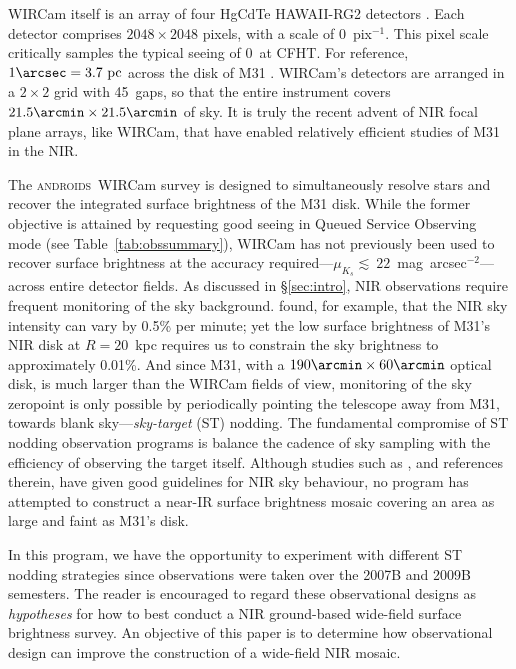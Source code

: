 \documentclass[iop]{emulateapj}
\newcommand{\androids}{\textsc{androids}}
\newcommand{\Tab}[1]{Table~\ref{tab:#1}}  %
\newcommand{\Sec}[1]{\S\ref{sec:#1}}  %
\begin{document}
WIRCam itself is an array of four HgCdTe HAWAII-RG2 detectors \citep{Puget:2004}.
Each detector comprises $2048\times 2048$ pixels, with a scale of 0~pix$^{-1}$.
This pixel scale critically samples the typical seeing of 0~at CFHT\@.
For reference, $1\arcsec = 3.7~\mathrm{pc}$ across the disk of M31 \citep[we adopt $D_\mathrm{M31} = 785$~kpc,][]{McConnachie:2005}.
WIRCam's detectors are arranged in a $2\times 2$ grid with 45\arcsec~gaps, so that the entire instrument covers $21.5\arcmin \times 21.5\arcmin$ of sky.
It is truly the recent advent of NIR focal plane arrays, like WIRCam, that have enabled relatively efficient studies of M31 in the NIR.

The \androids\ WIRCam survey is designed to simultaneously resolve stars and recover the integrated surface brightness of the M31 disk.
While the former objective is attained by requesting good seeing in Queued Service Observing mode (see \Tab{obssummary}), WIRCam has not previously been used to recover surface brightness at the accuracy required---$\mu_{K_s}\lesssim~22$~mag~arcsec$^{-2}$---across entire detector fields.
As discussed in \Sec{intro}, NIR observations require frequent monitoring of the sky background.
\cite{Vaduvescu:2004} found, for example, that the NIR sky intensity can vary by 0.5\% per minute; yet the low surface brightness of M31's NIR disk at $R=20$~kpc requires us to constrain the sky brightness to approximately 0.01\%.
And since M31, with a $190\arcmin \times 60\arcmin$ optical disk, is much larger than the WIRCam fields of view, monitoring of the sky zeropoint is only possible by periodically pointing the telescope away from M31, towards blank sky---\emph{sky-target} (ST) nodding. 
The fundamental compromise of ST nodding observation programs is balance the cadence of sky sampling with the efficiency of observing the target itself.
Although studies such as \cite{Vaduvescu:2004}, and references therein, have given good guidelines for NIR sky behaviour, no program has attempted to construct a near-IR surface brightness mosaic covering an area as large and faint as M31's disk.

In this program, we have the opportunity to experiment with different ST nodding strategies since observations were taken over the 2007B and 2009B semesters.
The reader is encouraged to regard these observational designs as \emph{hypotheses} for how to best conduct a NIR ground-based wide-field surface brightness survey.
An objective of this paper is to determine how observational design can improve the construction of a wide-field NIR mosaic.
\end{document}
